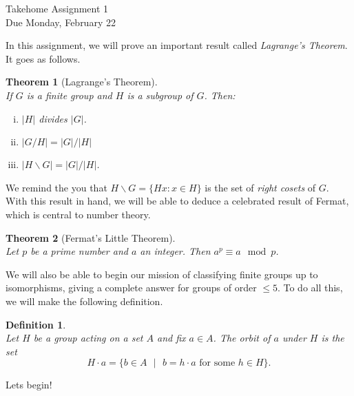 \documentclass[11pt]{article}
\newtheorem{theorem}{Theorem}
\newtheorem{definition}{Definition}
\begin{document}
\begin{center}
\Large {Takehome Assignment 1}\\
\small {Due Monday, February 22}
\end{center}
In this assignment, we will prove an important result called \textit{Lagrange's Theorem}.  It goes as follows.
\begin{theorem}[Lagrange's Theorem]~\\
  If $G$ is a finite group and $H$ is a subgroup of $G$.  Then:
  \begin{enumerate}[(i)]
     \item $|H|$ divides $|G|$.
     \item $|G/H| = |G|/|H|$
     \item $|H\backslash G| = |G|/|H|$.
  \end{enumerate}
\end{theorem}
We remind the you that $H\backslash G = \{Hx:x\in H\}$ is the set of \textit{right cosets} of $G$.  With this result in hand, we will be able to deduce a celebrated result of Fermat, which is central to number theory.
\begin{theorem}[Fermat's Little Theorem]~\\
  Let $p$ be a prime number and $a$ an integer.  Then $a^p\equiv a\mod p$.
\end{theorem}
We will also be able to begin our mission of classifying finite groups up to isomorphisms, giving a complete answer for groups of order $\le5$.  To do all this, we will make the following definition.
\begin{definition}~\\
  Let $H$ be a group acting on a set $A$ and fix $a\in A$.  The \textit{orbit} of $a$ under $H$ is the set
  \[H\cdot a = \{b\in A\text{ }|\text{ }b=h\cdot a\text{ for some }h\in H\}.\]
\end{definition}
Lets begin!
\end{document}
